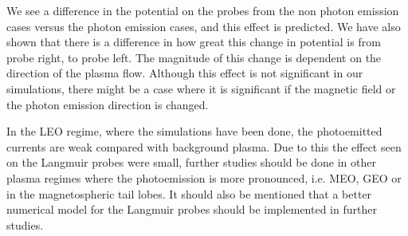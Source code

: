 
We see a difference in the potential on the probes from the non photon emission cases versus
the photon emission cases, and this effect is predicted. We have also shown that there
is a difference in how great this change in potential is from probe right, to probe left.
The magnitude of this change is dependent on the direction of the plasma flow. Although this effect
is not significant in our simulations, there might be a case where it is significant if
the magnetic field or the photon emission direction is changed.

In the LEO regime, where the simulations have been done, the photoemitted currents are weak compared with
background plasma. Due to this the effect seen on the Langmuir probes were small, further studies should be done
in other plasma regimes where the photoemission is more pronounced, i.e. MEO, GEO or in the magnetospheric tail lobes.
It should also be mentioned that a better numerical model for the Langmuir probes should be implemented in further
studies.
